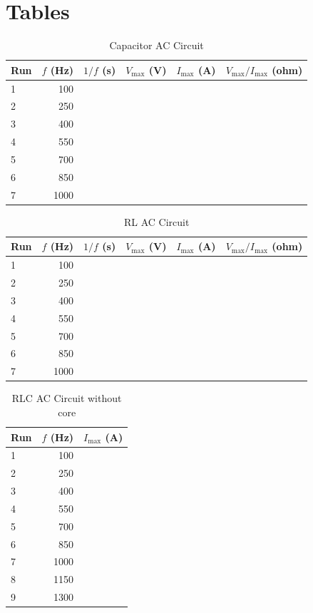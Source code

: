 \section{Tables}
%
\begin{table}[ht]
	\begin{center}
		\begin{tabular}{l|r|r|r|r|r}
			\textbf{Run} & $f$ (Hz) & $1/f$ (s) & $V_{\text{max}}$ (V) & $I_{\text{max}}$ (A) & $V_{\text{max}}/I_{\text{max}}$ (ohm) \\
			\hline
			1 & 100 & & & & \\
			2 & 250 & & & & \\
			3 & 400 & & & & \\
			4 & 550 & & & & \\
			5 & 700 & & & & \\
			6 & 850 & & & & \\
			7 & 1000 & & & & \\
			\hline
		\end{tabular}
	\end{center}
	\caption{Capacitor AC Circuit}
	\label{table.capacitor.student}
\end{table}
%
\begin{table}[ht]
	\begin{center}
		\begin{tabular}{l|r|r|r|r|r}
			\textbf{Run} & $f$ (Hz) & $1/f$ (s) & $V_{\text{max}}$ (V) & $I_{\text{max}}$ (A) & $V_{\text{max}}/I_{\text{max}}$ (ohm) \\
			\hline
			1 & 100 & & & & \\
			2 & 250 & & & & \\
			3 & 400 & & & & \\
			4 & 550 & & & & \\
			5 & 700 & & & & \\
			6 & 850 & & & & \\
			7 & 1000 & & & & \\
			\hline
		\end{tabular}
	\end{center}
	\caption{RL AC Circuit}
	\label{table.RL.student}
\end{table}
%
\begin{table}[ht]
	\begin{center}
		\begin{tabular}{l|r|r}
			\textbf{Run} & $f$ (Hz) & $I_{\text{max}}$ (A) \\
			\hline
			1 & 100 & \\
			2 & 250 & \\
			3 & 400 & \\
			4 & 550 & \\
			5 & 700 & \\
			6 & 850 & \\
			7 & 1000 & \\
			8 & 1150 & \\
			9 & 1300 & \\
			\hline
		\end{tabular}
	\end{center}
	\caption{RLC AC Circuit without core}
	\label{table.RLC.student}
\end{table}
